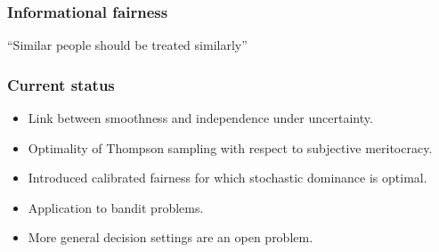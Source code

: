 \begin{frame}
  \frametitle{Informational fairness}

  ``Similar people should be treated similarly''

\end{frame}

\begin{frame}
  \frametitle{Current status}
  \begin{itemize}
  \item Link between smoothness and independence under uncertainty.
  \item Optimality of Thompson sampling with respect to subjective meritocracy.
  \item Introduced calibrated fairness for which stochastic dominance is optimal.
  \item Application to bandit problems.
  \item More general decision settings are an open problem.
  \end{itemize}

\end{frame}







